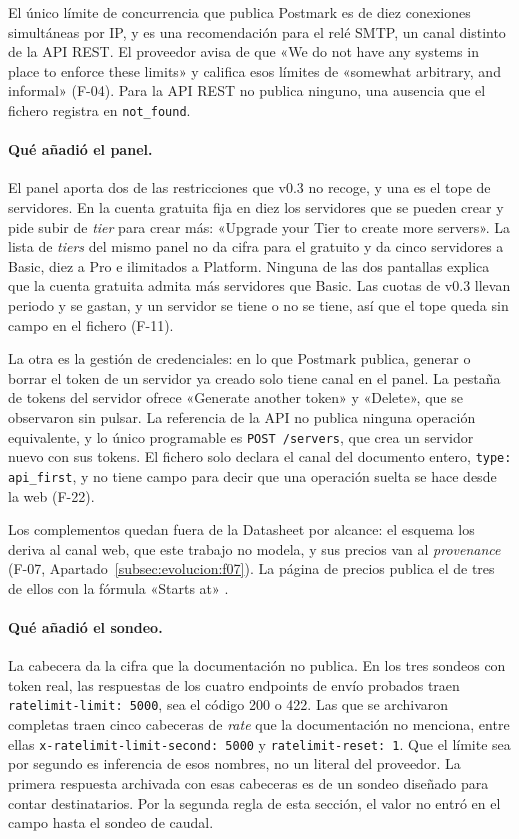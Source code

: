 El único límite de concurrencia que publica Postmark es de diez conexiones
simultáneas por IP, y es una recomendación para el relé SMTP, un canal
distinto de la API REST. El proveedor avisa de que «We do not have any
systems in place to enforce these limits» y califica esos límites de
«somewhat arbitrary, and informal» (F-04). Para la API REST no publica
ninguno, una ausencia que el fichero registra en \texttt{not\_found}.

\paragraph{Qué añadió el panel.} El panel aporta dos de las restricciones
que v0.3 no recoge, y una es el tope de servidores. En la cuenta gratuita
fija en diez los servidores que se pueden crear y pide subir de
\textit{tier} para crear más: «Upgrade your Tier to create more servers».
La lista de \textit{tiers} del mismo panel no da cifra para el gratuito y
da cinco servidores a Basic, diez a Pro e ilimitados a Platform. Ninguna de
las dos pantallas explica que la cuenta gratuita admita más servidores que
Basic. Las cuotas de v0.3 llevan periodo y se gastan, y un servidor se
tiene o no se tiene, así que el tope queda sin campo en el fichero (F-11).

La otra es la gestión de credenciales: en lo que Postmark publica, generar
o borrar el token de un servidor ya creado solo tiene canal en el panel. La
pestaña de tokens del servidor ofrece «Generate another token» y «Delete»,
que se observaron sin pulsar. La referencia de la API no publica ninguna
operación equivalente, y lo único programable es \texttt{POST /servers},
que crea un servidor nuevo con sus tokens. El fichero solo declara el canal
del documento entero, \texttt{type: api\_first}, y no tiene campo para
decir que una operación suelta se hace desde la web (F-22).

Los complementos quedan fuera de la Datasheet por alcance: el esquema
los deriva al canal web, que este trabajo no modela, y sus precios van al
\textit{provenance} (F-07, Apartado~\ref{subsec:evolucion:f07}). La
página de precios publica el de tres de ellos con la fórmula «Starts at»
\citep{postmarkpricing}.

\paragraph{Qué añadió el sondeo.} La cabecera da la cifra que la
documentación no publica. En los tres sondeos con token real, las
respuestas de los cuatro endpoints de envío probados traen
\texttt{ratelimit-limit: 5000}, sea el código 200 o 422. Las que se
archivaron completas traen cinco cabeceras de \textit{rate} que la
documentación no menciona, entre ellas
\texttt{x-ratelimit-limit-second: 5000} y \texttt{ratelimit-reset: 1}. Que
el límite sea por segundo es inferencia de esos nombres, no un literal del
proveedor. La primera respuesta archivada con esas cabeceras es de un
sondeo diseñado para contar destinatarios. Por la segunda regla de esta
sección, el valor no entró en el campo hasta el sondeo de caudal.

